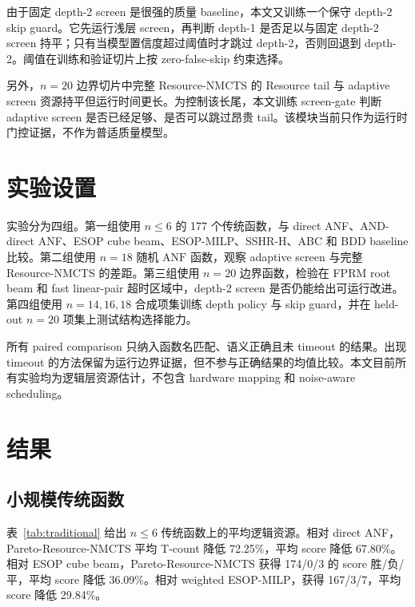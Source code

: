 \documentclass[UTF8,fontset=macnew,11pt]{ctexart}
\newcommand{\method}{Resource-NMCTS}
\newcommand{\pareto}{Pareto-Resource-NMCTS}
\newcommand{\anf}{\ensuremath{\mathrm{ANF}}}
\begin{document}
由于固定 depth-2 screen 是很强的质量 baseline，本文又训练一个保守 depth-2 skip guard。它先运行浅层 screen，再判断 depth-1 是否足以与固定 depth-2 screen 持平；只有当模型置信度超过阈值时才跳过 depth-2，否则回退到 depth-2。阈值在训练和验证切片上按 zero-false-skip 约束选择。

另外，$n=20$ 边界切片中完整 \method{} 的 Resource tail 与 adaptive screen 资源持平但运行时间更长。为控制该长尾，本文训练 screen-gate 判断 adaptive screen 是否已经足够、是否可以跳过昂贵 tail。该模块当前只作为运行时门控证据，不作为普适质量模型。

\section{实验设置}

实验分为四组。第一组使用 $n\leq6$ 的 177 个传统函数，与 direct ANF、AND-direct ANF、ESOP cube beam、ESOP-MILP、SSHR-H、ABC 和 BDD baseline 比较。第二组使用 $n=18$ 随机 \anf{} 函数，观察 adaptive screen 与完整 \method{} 的差距。第三组使用 $n=20$ 边界函数，检验在 FPRM root beam 和 fast linear-pair 超时区域中，depth-2 screen 是否仍能给出可运行改进。第四组使用 $n=14,16,18$ 合成项集训练 depth policy 与 skip guard，并在 held-out $n=20$ 项集上测试结构选择能力。

所有 paired comparison 只纳入函数名匹配、语义正确且未 timeout 的结果。出现 timeout 的方法保留为运行边界证据，但不参与正确结果的均值比较。本文目前所有实验均为逻辑层资源估计，不包含 hardware mapping 和 noise-aware scheduling。

\section{结果}

\subsection{小规模传统函数}

表~\ref{tab:traditional} 给出 $n\leq6$ 传统函数上的平均逻辑资源。相对 direct ANF，\pareto{} 平均 T-count 降低 72.25\%，平均 score 降低 67.80\%。相对 ESOP cube beam，\pareto{} 获得 174/0/3 的 score 胜/负/平，平均 score 降低 36.09\%。相对 weighted ESOP-MILP，获得 167/3/7，平均 score 降低 29.84\%。
\end{document}
